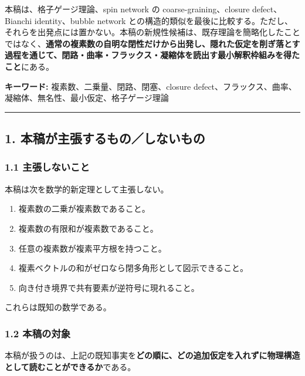 \documentclass[
  a4paper,
]{ltjsarticle}
\providecommand{\tightlist}{%
  \setlength{\itemsep}{0pt}\setlength{\parskip}{0pt}}
\begin{document}
本稿は、格子ゲージ理論、spin network の coarse-graining、closure
defect、Bianchi identity、bubble network
との構造的類似を最後に比較する。ただし、それらを出発点には置かない。本稿の新規性候補は、既存理論を簡略化したことではなく、\textbf{通常の複素数の自明な閉性だけから出発し、隠れた仮定を削ぎ落とす過程を通じて、閉路・曲率・フラックス・凝縮体を読出す最小解釈枠組みを得たこと}にある。

\textbf{キーワード:} 複素数、二乗量、閉路、閉塞、closure
defect、フラックス、曲率、凝縮体、無名性、最小仮定、格子ゲージ理論

\begin{center}\rule{0.5\linewidth}{0.5pt}\end{center}

\subsection{1.
本稿が主張するもの／しないもの}\label{ux672cux7a3fux304cux4e3bux5f35ux3059ux308bux3082ux306eux3057ux306aux3044ux3082ux306e}

\subsubsection{1.1
主張しないこと}\label{ux4e3bux5f35ux3057ux306aux3044ux3053ux3068}

本稿は次を数学的新定理として主張しない。

\begin{enumerate}
\def\labelenumi{\arabic{enumi}.}
\tightlist
\item
  複素数の二乗が複素数であること。
\item
  複素数の有限和が複素数であること。
\item
  任意の複素数が複素平方根を持つこと。
\item
  複素ベクトルの和がゼロなら閉多角形として図示できること。
\item
  向き付き境界で共有要素が逆符号に現れること。
\end{enumerate}

これらは既知の数学である。

\subsubsection{1.2 本稿の対象}\label{ux672cux7a3fux306eux5bfeux8c61}

本稿が扱うのは、上記の既知事実を\textbf{どの順に、どの追加仮定を入れずに物理構造として読むことができるか}である。
\end{document}
